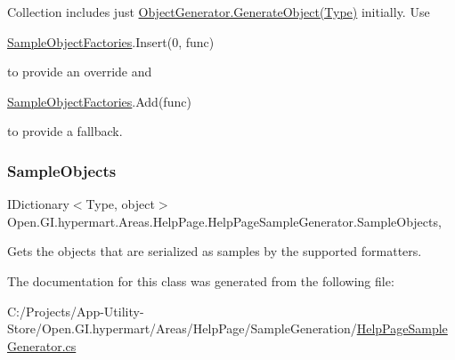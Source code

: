 Collection includes just \hyperlink{class_open_1_1_g_i_1_1hypermart_1_1_areas_1_1_help_page_1_1_object_generator_a118924d1ff5f565e6e9c2893d36f35d2}{Object\+Generator.\+Generate\+Object(\+Type)} initially. Use 
\begin{DoxyCode}
\hyperlink{class_open_1_1_g_i_1_1hypermart_1_1_areas_1_1_help_page_1_1_help_page_sample_generator_a659aa13a69376385d931264d06fbd398}{SampleObjectFactories}.Insert(0, func)
\end{DoxyCode}
 to provide an override and 
\begin{DoxyCode}
\hyperlink{class_open_1_1_g_i_1_1hypermart_1_1_areas_1_1_help_page_1_1_help_page_sample_generator_a659aa13a69376385d931264d06fbd398}{SampleObjectFactories}.Add(func)
\end{DoxyCode}
 to provide a fallback.\hypertarget{class_open_1_1_g_i_1_1hypermart_1_1_areas_1_1_help_page_1_1_help_page_sample_generator_a1a16afd9020493bb00d793ed79d0a056}{}\label{class_open_1_1_g_i_1_1hypermart_1_1_areas_1_1_help_page_1_1_help_page_sample_generator_a1a16afd9020493bb00d793ed79d0a056} 
\subsubsection{\texorpdfstring{Sample\+Objects}{SampleObjects}}
{\footnotesize\ttfamily I\+Dictionary$<$Type, object$>$ Open.\+G\+I.\+hypermart.\+Areas.\+Help\+Page.\+Help\+Page\+Sample\+Generator.\+Sample\+Objects\hspace{0.3cm}{\ttfamily [get]}, {\ttfamily [set]}}



Gets the objects that are serialized as samples by the supported formatters. 



The documentation for this class was generated from the following file\+:\begin{DoxyCompactItemize}
\item 
C\+:/\+Projects/\+App-\/\+Utility-\/\+Store/\+Open.\+G\+I.\+hypermart/\+Areas/\+Help\+Page/\+Sample\+Generation/\hyperlink{_help_page_sample_generator_8cs}{Help\+Page\+Sample\+Generator.\+cs}\end{DoxyCompactItemize}
